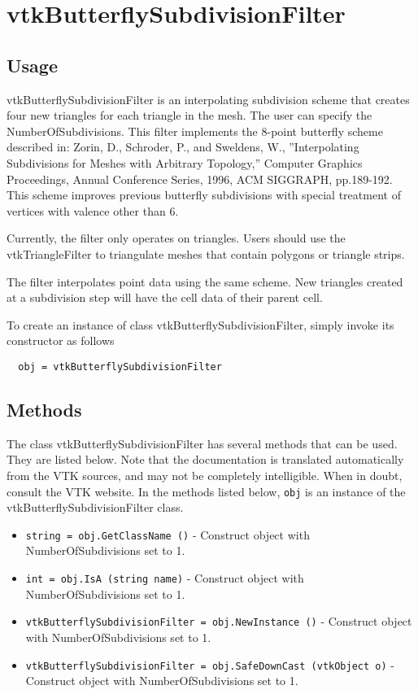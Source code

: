 \section{vtkButterflySubdivisionFilter}

\subsection{Usage}

 vtkButterflySubdivisionFilter is an interpolating subdivision scheme
 that creates four new triangles for each triangle in the mesh. The
 user can specify the NumberOfSubdivisions. This filter implements the
 8-point butterfly scheme described in: Zorin, D., Schroder, P., and
 Sweldens, W., ''Interpolating Subdivisions for Meshes with Arbitrary
 Topology,'' Computer Graphics Proceedings, Annual Conference Series,
 1996, ACM SIGGRAPH, pp.189-192. This scheme improves previous
 butterfly subdivisions with special treatment of vertices with valence
 other than 6.
 
 Currently, the filter only operates on triangles. Users should use the
 vtkTriangleFilter to triangulate meshes that contain polygons or
 triangle strips.
 
 The filter interpolates point data using the same scheme. New
 triangles created at a subdivision step will have the cell data of
 their parent cell.

To create an instance of class vtkButterflySubdivisionFilter, simply
invoke its constructor as follows
\begin{verbatim}
  obj = vtkButterflySubdivisionFilter
\end{verbatim}
\subsection{Methods}

The class vtkButterflySubdivisionFilter has several methods that can be used.
  They are listed below.
Note that the documentation is translated automatically from the VTK sources,
and may not be completely intelligible.  When in doubt, consult the VTK website.
In the methods listed below, \verb|obj| is an instance of the vtkButterflySubdivisionFilter class.
\begin{itemize}
\item  \verb|string = obj.GetClassName ()| -  Construct object with NumberOfSubdivisions set to 1.

\item  \verb|int = obj.IsA (string name)| -  Construct object with NumberOfSubdivisions set to 1.

\item  \verb|vtkButterflySubdivisionFilter = obj.NewInstance ()| -  Construct object with NumberOfSubdivisions set to 1.

\item  \verb|vtkButterflySubdivisionFilter = obj.SafeDownCast (vtkObject o)| -  Construct object with NumberOfSubdivisions set to 1.

\end{itemize}
